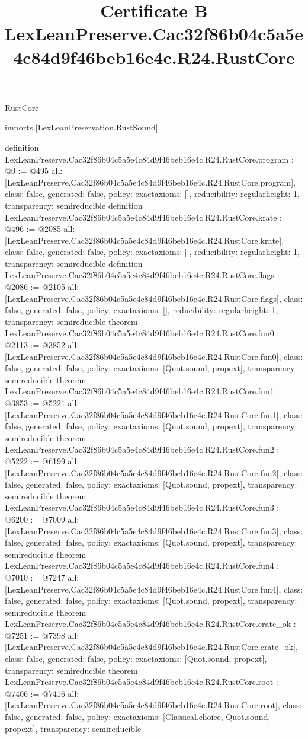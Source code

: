 \begin{lexlean}{RustCore}
\title{Certificate B LexLeanPreserve.Cac32f86b04c5a5e4c84d9f46beb16e4c.R24.RustCore}
\begin{coremodule}
imports [LexLeanPreservation.RustSound]

definition LexLeanPreserve.Cac32f86b04c5a5e4c84d9f46beb16e4c.R24.RustCore.program : @0 := @495 {
  all: [LexLeanPreserve.Cac32f86b04c5a5e4c84d9f46beb16e4c.R24.RustCore.program],
  class: false,
  generated: false,
  policy: exact{axioms: []},
  reducibility: regular{height: 1},
  transparency: semireducible
}
definition LexLeanPreserve.Cac32f86b04c5a5e4c84d9f46beb16e4c.R24.RustCore.krate : @496 := @2085 {
  all: [LexLeanPreserve.Cac32f86b04c5a5e4c84d9f46beb16e4c.R24.RustCore.krate],
  class: false,
  generated: false,
  policy: exact{axioms: []},
  reducibility: regular{height: 1},
  transparency: semireducible
}
definition LexLeanPreserve.Cac32f86b04c5a5e4c84d9f46beb16e4c.R24.RustCore.flags : @2086 := @2105 {
  all: [LexLeanPreserve.Cac32f86b04c5a5e4c84d9f46beb16e4c.R24.RustCore.flags],
  class: false,
  generated: false,
  policy: exact{axioms: []},
  reducibility: regular{height: 1},
  transparency: semireducible
}
theorem LexLeanPreserve.Cac32f86b04c5a5e4c84d9f46beb16e4c.R24.RustCore.fun0 : @2113 := @3852 {
  all: [LexLeanPreserve.Cac32f86b04c5a5e4c84d9f46beb16e4c.R24.RustCore.fun0],
  class: false,
  generated: false,
  policy: exact{axioms: [Quot.sound, propext]},
  transparency: semireducible
}
theorem LexLeanPreserve.Cac32f86b04c5a5e4c84d9f46beb16e4c.R24.RustCore.fun1 : @3853 := @5221 {
  all: [LexLeanPreserve.Cac32f86b04c5a5e4c84d9f46beb16e4c.R24.RustCore.fun1],
  class: false,
  generated: false,
  policy: exact{axioms: [Quot.sound, propext]},
  transparency: semireducible
}
theorem LexLeanPreserve.Cac32f86b04c5a5e4c84d9f46beb16e4c.R24.RustCore.fun2 : @5222 := @6199 {
  all: [LexLeanPreserve.Cac32f86b04c5a5e4c84d9f46beb16e4c.R24.RustCore.fun2],
  class: false,
  generated: false,
  policy: exact{axioms: [Quot.sound, propext]},
  transparency: semireducible
}
theorem LexLeanPreserve.Cac32f86b04c5a5e4c84d9f46beb16e4c.R24.RustCore.fun3 : @6200 := @7009 {
  all: [LexLeanPreserve.Cac32f86b04c5a5e4c84d9f46beb16e4c.R24.RustCore.fun3],
  class: false,
  generated: false,
  policy: exact{axioms: [Quot.sound, propext]},
  transparency: semireducible
}
theorem LexLeanPreserve.Cac32f86b04c5a5e4c84d9f46beb16e4c.R24.RustCore.fun4 : @7010 := @7247 {
  all: [LexLeanPreserve.Cac32f86b04c5a5e4c84d9f46beb16e4c.R24.RustCore.fun4],
  class: false,
  generated: false,
  policy: exact{axioms: [Quot.sound, propext]},
  transparency: semireducible
}
theorem LexLeanPreserve.Cac32f86b04c5a5e4c84d9f46beb16e4c.R24.RustCore.crate_ok : @7251 := @7398 {
  all: [LexLeanPreserve.Cac32f86b04c5a5e4c84d9f46beb16e4c.R24.RustCore.crate_ok],
  class: false,
  generated: false,
  policy: exact{axioms: [Quot.sound, propext]},
  transparency: semireducible
}
theorem LexLeanPreserve.Cac32f86b04c5a5e4c84d9f46beb16e4c.R24.RustCore.root : @7406 := @7416 {
  all: [LexLeanPreserve.Cac32f86b04c5a5e4c84d9f46beb16e4c.R24.RustCore.root],
  class: false,
  generated: false,
  policy: exact{axioms: [Classical.choice, Quot.sound, propext]},
  transparency: semireducible
}


\end{coremodule}
\end{lexlean}
